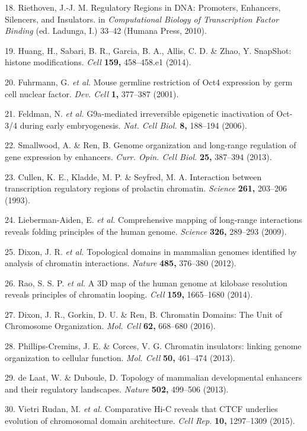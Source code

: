 \documentclass[11pt,twoside]{MPIthesis}
\theoremstyle{definition}
\theoremstyle{definition}
\theoremstyle{definition}
\theoremstyle{remark}
\begin{document}
18. Riethoven, J.-J. M. Regulatory Regions in DNA: Promoters, Enhancers,
Silencers, and Insulators. in \emph{Computational Biology of
Transcription Factor Binding} (ed. Ladunga, I.) 33--42 (Humana Press,
2010).

19. Huang, H., Sabari, B. R., Garcia, B. A., Allis, C. D. \& Zhao, Y.
SnapShot: histone modifications. \emph{Cell} \textbf{159,} 458--458.e1
(2014).

20. Fuhrmann, G. \emph{et al.} Mouse germline restriction of Oct4
expression by germ cell nuclear factor. \emph{Dev. Cell} \textbf{1,}
377--387 (2001).

21. Feldman, N. \emph{et al.} G9a-mediated irreversible epigenetic
inactivation of Oct-3/4 during early embryogenesis. \emph{Nat. Cell
Biol.} \textbf{8,} 188--194 (2006).

22. Smallwood, A. \& Ren, B. Genome organization and long-range
regulation of gene expression by enhancers. \emph{Curr. Opin. Cell
Biol.} \textbf{25,} 387--394 (2013).

23. Cullen, K. E., Kladde, M. P. \& Seyfred, M. A. Interaction between
transcription regulatory regions of prolactin chromatin. \emph{Science}
\textbf{261,} 203--206 (1993).

24. Lieberman-Aiden, E. \emph{et al.} Comprehensive mapping of
long-range interactions reveals folding principles of the human genome.
\emph{Science} \textbf{326,} 289--293 (2009).

25. Dixon, J. R. \emph{et al.} Topological domains in mammalian genomes
identified by analysis of chromatin interactions. \emph{Nature}
\textbf{485,} 376--380 (2012).

26. Rao, S. S. P. \emph{et al.} A 3D map of the human genome at kilobase
resolution reveals principles of chromatin looping. \emph{Cell}
\textbf{159,} 1665--1680 (2014).

27. Dixon, J. R., Gorkin, D. U. \& Ren, B. Chromatin Domains: The Unit
of Chromosome Organization. \emph{Mol. Cell} \textbf{62,} 668--680
(2016).

28. Phillips-Cremins, J. E. \& Corces, V. G. Chromatin insulators:
linking genome organization to cellular function. \emph{Mol. Cell}
\textbf{50,} 461--474 (2013).

29. de Laat, W. \& Duboule, D. Topology of mammalian developmental
enhancers and their regulatory landscapes. \emph{Nature} \textbf{502,}
499--506 (2013).

30. Vietri Rudan, M. \emph{et al.} Comparative Hi-C reveals that CTCF
underlies evolution of chromosomal domain architecture. \emph{Cell Rep.}
\textbf{10,} 1297--1309 (2015).
\end{document}

